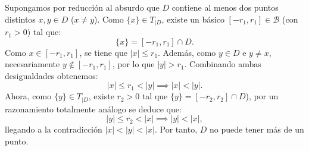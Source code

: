 \documentclass[12pt]{article}
\begin{document}
\begin{ejercicio}
\begin{enumerate}
        Supongamos por reducción al absurdo que $D$ contiene al menos dos puntos distintos $x, y \in D$ ($x \neq y$). Como $\{x\} \in T_{|D}$, existe un básico $[-r_1, r_1] \in \mathcal{B}$ (con $r_1 > 0$) tal que:
        \[
            \{x\} = [-r_1, r_1] \cap D.
        \]
        Como $x \in [-r_1, r_1]$, se tiene que $|x| \le r_1$. Además, como $y \in D$ e $y \neq x$, necesariamente $y \notin [-r_1, r_1]$, por lo que $|y| > r_1$. Combinando ambas desigualdades obtenemos:
        \[
            |x| \le r_1 < |y| \implies |x| < |y|.
        \]
        Ahora, como $\{y\} \in T_{|D}$, existe $r_2 > 0$ tal que $\{y\} = [-r_2, r_2] \cap D$), por un razonamiento totalmente análogo se deduce que:
        \[
            |y| \le r_2 < |x| \implies |y| < |x|,
        \]
        llegando a la contradicción $|x| < |y| < |x|$. Por tanto, $D$ no puede tener más de un punto.
        \end{enumerate}
    \end{ejercicio}
\end{document}

